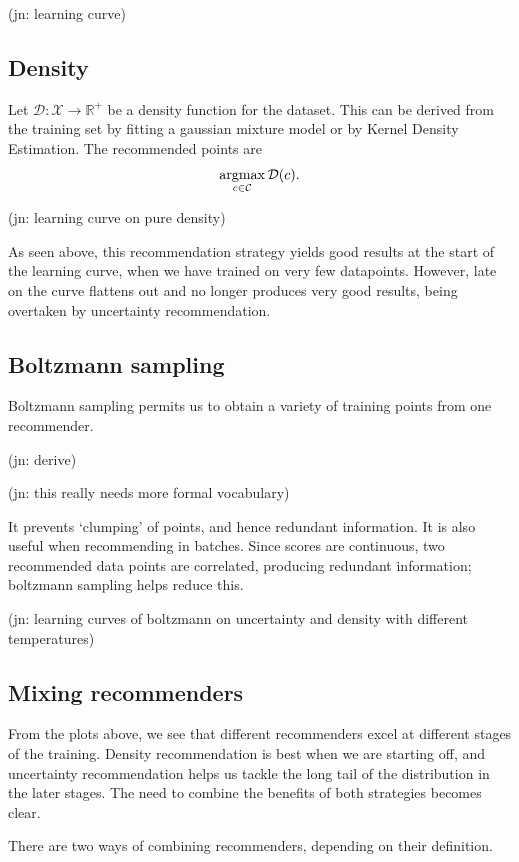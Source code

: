 \documentclass[11pt,twoside]{report}
\newcommand\bbR{\mathbb{R}}
\newcommand\cC{\mathcal{C}}
\newcommand\cD{\mathcal{D}}
\newcommand\cX{\mathcal{X}}
\DeclareMathOperator*{\argmax}{argmax}
\newcommand\jn[1]{{\color{red}(jn: #1)}}
\begin{document}
\jn{learning curve}

\subsection{Density}

Let $\cD : \cX \to \bbR^+$ be a density function for the dataset. This can be derived from the training set by fitting a gaussian mixture model or by Kernel Density Estimation. The recommended points are \[
    \argmax_{c \in \cC} \cD(c) \text.
\]

\jn{learning curve on pure density}

As seen above, this recommendation strategy yields good results at the start of the learning curve, when we have trained on very few datapoints. However, late on the curve flattens out and no longer produces very good results, being overtaken by uncertainty recommendation.

\subsection{Boltzmann sampling}

Boltzmann sampling permits us to obtain a variety of training points from one recommender.

\jn{derive}

\jn{this really needs more formal vocabulary}

It prevents `clumping' of points, and hence redundant information. It is also useful when recommending in batches. Since scores are continuous, two recommended data points are correlated, producing redundant information; boltzmann sampling helps reduce this.

\jn{learning curves of boltzmann on uncertainty and density with different temperatures}

\subsection{Mixing recommenders}

From the plots above, we see that different recommenders excel at different stages of the training. Density recommendation is best when we are starting off, and uncertainty recommendation helps us tackle the long tail of the distribution in the later stages. The need to combine the benefits of both strategies becomes clear.

There are two ways of combining recommenders, depending on their definition.
\end{document}
